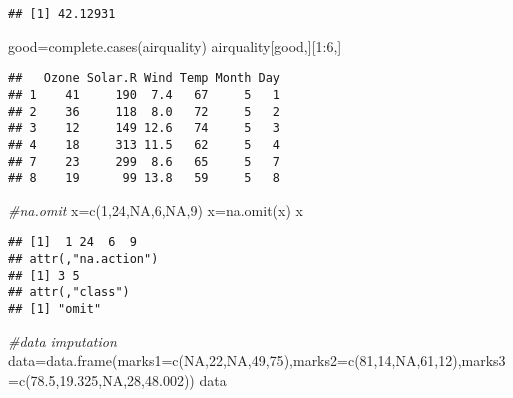 \documentclass[
]{article}
\newenvironment{Shaded}{\begin{snugshade}}{\end{snugshade}}
\newcommand{\AttributeTok}[1]{\textcolor[rgb]{0.77,0.63,0.00}{#1}}
\newcommand{\CommentTok}[1]{\textcolor[rgb]{0.56,0.35,0.01}{\textit{#1}}}
\newcommand{\ConstantTok}[1]{\textcolor[rgb]{0.00,0.00,0.00}{#1}}
\newcommand{\DecValTok}[1]{\textcolor[rgb]{0.00,0.00,0.81}{#1}}
\newcommand{\FloatTok}[1]{\textcolor[rgb]{0.00,0.00,0.81}{#1}}
\newcommand{\FunctionTok}[1]{\textcolor[rgb]{0.00,0.00,0.00}{#1}}
\newcommand{\NormalTok}[1]{#1}
\newcommand{\OtherTok}[1]{\textcolor[rgb]{0.56,0.35,0.01}{#1}}
\newcommand{\SpecialCharTok}[1]{\textcolor[rgb]{0.00,0.00,0.00}{#1}}
\begin{document}
\begin{Shaded}
\end{Shaded}

\begin{verbatim}
## [1] 42.12931
\end{verbatim}

\begin{Shaded}
\begin{Highlighting}[]
\NormalTok{good}\OtherTok{=}\FunctionTok{complete.cases}\NormalTok{(airquality)}
\NormalTok{airquality[good,][}\DecValTok{1}\SpecialCharTok{:}\DecValTok{6}\NormalTok{,]}
\end{Highlighting}
\end{Shaded}

\begin{verbatim}
##   Ozone Solar.R Wind Temp Month Day
## 1    41     190  7.4   67     5   1
## 2    36     118  8.0   72     5   2
## 3    12     149 12.6   74     5   3
## 4    18     313 11.5   62     5   4
## 7    23     299  8.6   65     5   7
## 8    19      99 13.8   59     5   8
\end{verbatim}

\begin{Shaded}
\begin{Highlighting}[]
\CommentTok{\#na.omit}
\NormalTok{x}\OtherTok{=}\FunctionTok{c}\NormalTok{(}\DecValTok{1}\NormalTok{,}\DecValTok{24}\NormalTok{,}\ConstantTok{NA}\NormalTok{,}\DecValTok{6}\NormalTok{,}\ConstantTok{NA}\NormalTok{,}\DecValTok{9}\NormalTok{)}
\NormalTok{x}\OtherTok{=}\FunctionTok{na.omit}\NormalTok{(x)}
\NormalTok{x}
\end{Highlighting}
\end{Shaded}

\begin{verbatim}
## [1]  1 24  6  9
## attr(,"na.action")
## [1] 3 5
## attr(,"class")
## [1] "omit"
\end{verbatim}

\begin{Shaded}
\begin{Highlighting}[]
\CommentTok{\#data imputation}
\NormalTok{data}\OtherTok{=}\FunctionTok{data.frame}\NormalTok{(}\AttributeTok{marks1=}\FunctionTok{c}\NormalTok{(}\ConstantTok{NA}\NormalTok{,}\DecValTok{22}\NormalTok{,}\ConstantTok{NA}\NormalTok{,}\DecValTok{49}\NormalTok{,}\DecValTok{75}\NormalTok{),}\AttributeTok{marks2=}\FunctionTok{c}\NormalTok{(}\DecValTok{81}\NormalTok{,}\DecValTok{14}\NormalTok{,}\ConstantTok{NA}\NormalTok{,}\DecValTok{61}\NormalTok{,}\DecValTok{12}\NormalTok{),}\AttributeTok{marks3=}\FunctionTok{c}\NormalTok{(}\FloatTok{78.5}\NormalTok{,}\FloatTok{19.325}\NormalTok{,}\ConstantTok{NA}\NormalTok{,}\DecValTok{28}\NormalTok{,}\FloatTok{48.002}\NormalTok{))}
\NormalTok{data}
\end{Highlighting}
\end{Shaded}
\end{document}
